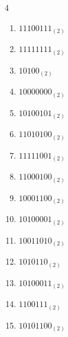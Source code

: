 \begin{multicols}{4}
\begin{enumerate}
        \phantom{$=216$}

  \item $11100111_{(2)}$

        \phantom{$=231$}

\columnbreak %

  \item $11111111_{(2)}$

        \phantom{$=255$}

  \item $10100_{(2)}$

        \phantom{$=20$}

  \item $10000000_{(2)}$

        \phantom{$=128$}

  \item $10100101_{(2)}$

        \phantom{$=165$}

  \item $11010100_{(2)}$

        \phantom{$=212$}

  \item $11111001_{(2)}$

        \phantom{$=249$}

  \item $11000100_{(2)}$

        \phantom{$=196$}

  \item $10001100_{(2)}$

        \phantom{$=140$}

  \item $10100001_{(2)}$

        \phantom{$=161$}

  \item $10011010_{(2)}$

        \phantom{$=154$}

  \item $1010110_{(2)}$

        \phantom{$=86$}

  \item $10100011_{(2)}$

        \phantom{$=163$}

  \item $1100111_{(2)}$

        \phantom{$=103$}

  \item $10101100_{(2)}$


\end{enumerate}
\end{multicols}
